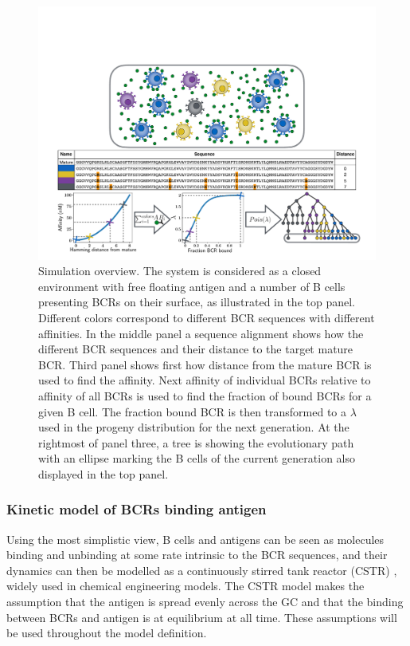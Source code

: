 \begin{figure}[ht!]
    \centering
    \includegraphics[width=1\textwidth]{figures/simulation_figure.pdf}
    \caption{
        \label{fig:simulation_figure}
        Simulation overview.
        The system is considered as a closed environment with free floating antigen and a number of B cells presenting BCRs on their surface, as illustrated in the top panel.
        Different colors correspond to different BCR sequences with different affinities.
        In the middle panel a sequence alignment shows how the different BCR sequences and their distance to the target mature BCR.
        Third panel shows first how distance from the mature BCR is used to find the affinity.
        Next affinity of individual BCRs relative to affinity of all BCRs is used to find the fraction of bound BCRs for a given B cell.
        The fraction bound BCR is then transformed to a $\lambda$ used in the progeny distribution for the next generation.
        At the rightmost of panel three, a tree is showing the evolutionary path with an ellipse marking the B cells of the current generation also displayed in the top panel.
    }
\end{figure}







\subsubsection{Kinetic model of BCRs binding antigen}
Using the most simplistic view, B cells and antigens can be seen as molecules binding and unbinding at some rate intrinsic to the BCR sequences, and their dynamics can then be modelled as a continuously stirred tank reactor (CSTR) \cite{CSTR}, widely used in chemical engineering models.
The CSTR model makes the assumption that the antigen is spread evenly across the GC and that the binding between BCRs and antigen is at equilibrium at all time.
These assumptions will be used throughout the model definition.

